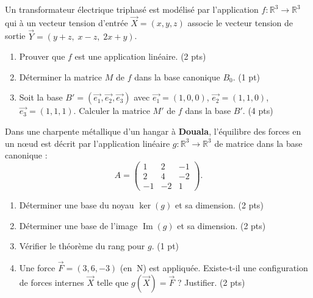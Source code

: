 \documentclass[11pt]{article}
\begin{document}
\begin{exercice}
Un transformateur électrique triphasé est modélisé par l'application $f : \mathbb{R}^3 \to \mathbb{R}^3$ qui à un vecteur tension d'entrée $\vec{X}=(x,y,z)$ associe le vecteur tension de sortie $\vec{Y}=(y+z,\; x-z,\; 2x+y)$.
\begin{enumerate}
    \item Prouver que $f$ est une application linéaire. \hfill (2 pts)
    \item Déterminer la matrice $M$ de $f$ dans la base canonique $B_0$. \hfill (1 pt)
    \item Soit la base $B'=(\vec{e_1},\vec{e_2},\vec{e_3})$ avec $\vec{e_1}=(1,0,0)$, $\vec{e_2}=(1,1,0)$, $\vec{e_3}=(1,1,1)$. Calculer la matrice $M'$ de $f$ dans la base $B'$. \hfill (4 pts)
\end{enumerate}
\end{exercice}

\begin{exercice}
Dans une charpente métallique d'un hangar à \textbf{Douala}, l'équilibre des forces en un nœud est décrit par l'application linéaire $g : \mathbb{R}^3 \to \mathbb{R}^3$ de matrice dans la base canonique :
\[
A = \begin{pmatrix}
1 & 2 & -1 \\
2 & 4 & -2 \\
-1 & -2 & 1
\end{pmatrix}.
\]
\begin{enumerate}
    \item Déterminer une base du noyau $\ker(g)$ et sa dimension. \hfill (2 pts)
    \item Déterminer une base de l'image $\operatorname{Im}(g)$ et sa dimension. \hfill (2 pts)
    \item Vérifier le théorème du rang pour $g$. \hfill (1 pt)
    \item Une force $\vec{F}=(3,6,-3)$ (en $\SI{}{\newton}$) est appliquée. Existe-t-il une configuration de forces internes $\vec{X}$ telle que $g(\vec{X})=\vec{F}$ ? Justifier. \hfill (2 pts)
\end{enumerate}
\end{exercice}
\end{document}
